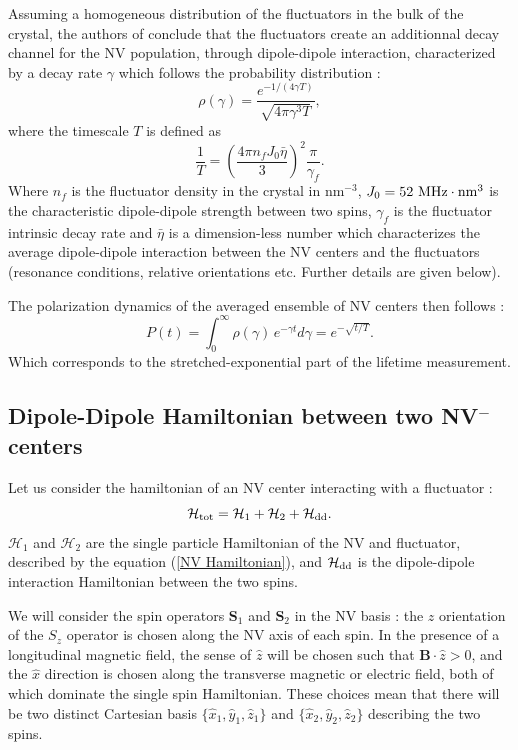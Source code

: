\documentclass[preprintnumbers,amsmath,amssymb,onecolumn,12pt]{revtex4-2}\usepackage{graphicx}%
\begin{document}
Assuming a homogeneous distribution of the fluctuators in the bulk of the crystal, the authors of \cite{choi_depolarization_2017} conclude that the fluctuators create an additionnal decay channel for the NV population, through dipole-dipole interaction, characterized by a decay rate $\gamma$ which follows the probability distribution :
\begin{equation}
\rho(\gamma)=\frac{e^{-1/(4\gamma T)}}{\sqrt{4\pi \gamma^3 T}},
\end{equation}
where the timescale $T$ is defined as
\begin{equation}
\frac{1}{T}=\left(\frac{4\pi n_fJ_0\bar \eta}{3}\right)^2 \frac{\pi}{\gamma_f}.
\label{eq 1/T}
\end{equation}
Where $n_f$ is the fluctuator density in the crystal in nm$^{-3}$, $J_0=52\ \rm{MHz}\cdot\rm{nm}^3$ is the characteristic dipole-dipole strength between two spins, $\gamma_f$ is the fluctuator intrinsic decay rate and $\bar \eta$ is a dimension-less number which characterizes the average dipole-dipole interaction between the NV centers and the fluctuators (resonance conditions, relative orientations etc. Further details are given below).

The polarization dynamics of the averaged ensemble of NV centers then follows :
\begin{equation}
P(t)=\int_0^\infty \rho(\gamma)\, e^{-\gamma t}d\gamma= e^{-\sqrt{t/T}}.
\end{equation}
Which corresponds to the stretched-exponential part of the lifetime measurement.
\subsection{Dipole-Dipole Hamiltonian between two NV$^-$ centers}
Let us consider the hamiltonian of an NV center interacting with a fluctuator :
\begin{equation}
\mathcal{H}_{\rm tot}=\mathcal{H}_{1}+\mathcal{H}_2+\mathcal{H}_{\rm dd}.
\end{equation}
$\mathcal{H}_{1}$ and $\mathcal{H}_{2}$ are the single particle Hamiltonian of the NV and fluctuator, described by the equation (\ref{NV Hamiltonian}), and $\mathcal{H}_{\rm dd}$ is the dipole-dipole interaction Hamiltonian between the two spins. 

We will consider the spin operators $\bm{S}_1$ and
$\bm{S}_2$ in the NV basis : the $z$ orientation of the $S_z$ operator is chosen along the NV axis of each spin. In the presence of a longitudinal magnetic field, the sense of $\hat{z}$ will be chosen such that $\bm{B}\cdot \hat{z} >0$, and the $\hat{x}$ direction is chosen along the transverse magnetic or electric field, both of which dominate the single spin Hamiltonian. These choices mean that there will be two distinct Cartesian basis $\{\hat{x}_1,\hat{y}_1,\hat{z}_1\}$ and $\{\hat{x}_2,\hat{y}_2,\hat{z}_2\}$ describing the two spins.
\end{document}
